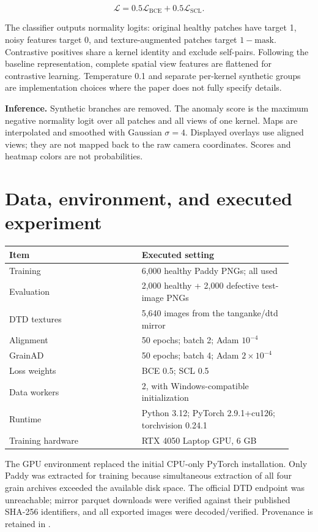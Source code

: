 \documentclass[11pt,a4paper]{article}
\newcommand{\code}[1]{\texttt{\small\detokenize{#1}}}
\begin{document}
\[
\mathcal{L}=0.5\mathcal{L}_{\mathrm{BCE}}+0.5\mathcal{L}_{\mathrm{SCL}}.
\]

The classifier outputs normality logits: original healthy patches have target 1, noisy features target 0, and texture-augmented patches target $1-\text{mask}$. Contrastive positives share a kernel identity and exclude self-pairs. Following the baseline representation, complete spatial view features are flattened for contrastive learning. Temperature 0.1 and separate per-kernel synthetic groups are implementation choices where the paper does not fully specify details.

\textbf{Inference.} Synthetic branches are removed. The anomaly score is the maximum negative normality logit over all patches and all views of one kernel. Maps are interpolated and smoothed with Gaussian $\sigma=4$. Displayed overlays use aligned views; they are not mapped back to the raw camera coordinates. Scores and heatmap colors are not probabilities.

\section{Data, environment, and executed experiment}
\begin{tabular}{p{0.43\linewidth}p{0.49\linewidth}}
\toprule
Item & Executed setting\\\midrule
Training & 6,000 healthy Paddy PNGs; all used\\
Evaluation & 2,000 healthy + 2,000 defective test-image PNGs\\
DTD textures & 5,640 images from the tanganke/dtd mirror\\
Alignment & 50 epochs; batch 2; Adam $10^{-4}$\\
GrainAD & 50 epochs; batch 4; Adam $2\times10^{-4}$\\
Loss weights & BCE 0.5; SCL 0.5\\
Data workers & 2, with Windows-compatible initialization\\
Runtime & Python 3.12; PyTorch 2.9.1+cu126; torchvision 0.24.1\\
Training hardware & RTX 4050 Laptop GPU, 6 GB\\
\bottomrule
\end{tabular}

The GPU environment replaced the initial CPU-only PyTorch installation. Only Paddy was extracted for training because simultaneous extraction of all four grain archives exceeded the available disk space. The official DTD endpoint was unreachable; mirror parquet downloads were verified against their published SHA-256 identifiers, and all exported images were decoded/verified. Provenance is retained in \code{datasets/dtd/SOURCE.json}.
\end{document}
